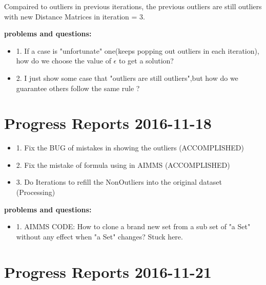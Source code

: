 \documentclass[]{article}
\begin{document}
Compaired to outliers in previous iterations, the previous outliers are still outliers with new Distance Matrices in iteration = 3.

{\bf problems and questions:}
\begin{itemize}
\item 1. If a case is "unfortunate" one(keeps popping out outliers in each iteration), how do we choose the value of $\epsilon$ to get a solution?

\item 2. I just show some case that "outliers are still outliers",but how do we guarantee others follow the same rule ?

\end{itemize}
\newpage

\section{Progress Reports 2016-11-18}

\begin{itemize}
\item 1. Fix the BUG of mistakes in showing the outliers (ACCOMPLISHED)

\item 2. Fix the mistake of formula using in AIMMS (ACCOMPLISHED)

\item 3. Do Iterations to refill the NonOutliers into the original dataset (Processing)


\end{itemize}
{\bf problems and questions:}
\begin{itemize}
\item 1. AIMMS CODE: How to clone a brand new set from a sub set of "a Set" without any effect when "a Set" changes? Stuck here. 

\end{itemize}



\newpage

\section{Progress Reports 2016-11-21}
\end{document}

